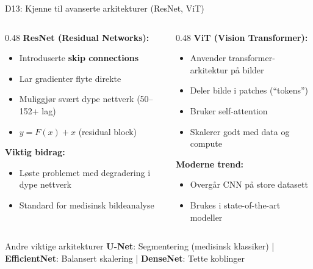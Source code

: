 \documentclass[aspectratio=169, 10pt]{beamer}
\begin{document}
\begin{frame}{D13: Kjenne til avanserte arkitekturer (ResNet, ViT)}
    \begin{columns}[T]
        \begin{column}{0.48\textwidth}
            \textbf{ResNet (Residual Networks):}
            \begin{itemize}
                \item Introduserte \textbf{skip connections}
                \item Lar gradienter flyte direkte
                \item Muliggjør svært dype nettverk (50--152+ lag)
                \item $y = F(x) + x$ (residual block)
            \end{itemize}
            
            \vspace{0.2cm}
            \textbf{Viktig bidrag:}
            \begin{itemize}
                \item Løste problemet med degradering i dype nettverk
                \item Standard for medisinsk bildeanalyse
            \end{itemize}
        \end{column}
        \begin{column}{0.48\textwidth}
            \textbf{ViT (Vision Transformer):}
            \begin{itemize}
                \item Anvender transformer-arkitektur på bilder
                \item Deler bilde i patches (``tokens'')
                \item Bruker self-attention
                \item Skalerer godt med data og compute
            \end{itemize}
            
            \vspace{0.2cm}
            \textbf{Moderne trend:}
            \begin{itemize}
                \item Overgår CNN på store datasett
                \item Brukes i state-of-the-art modeller
            \end{itemize}
        \end{column}
    \end{columns}
    
    \vspace{0.3cm}
    \begin{block}{Andre viktige arkitekturer}
        \textbf{U-Net}: Segmentering (medisinsk klassiker) | \textbf{EfficientNet}: Balansert skalering | \textbf{DenseNet}: Tette koblinger
    \end{block}
\end{frame}
\end{document}
